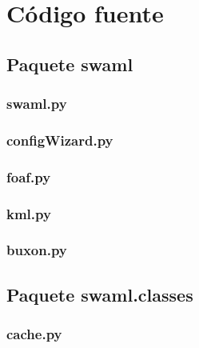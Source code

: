 
\chapter{Código fuente\label{sec:source}} 

\section*{Paquete swaml}

\subsection*{swaml.py}



\subsection*{configWizard.py}



\subsection*{foaf.py}



\subsection*{kml.py}



\subsection*{buxon.py}




\section*{Paquete swaml.classes}

\subsection*{cache.py}



